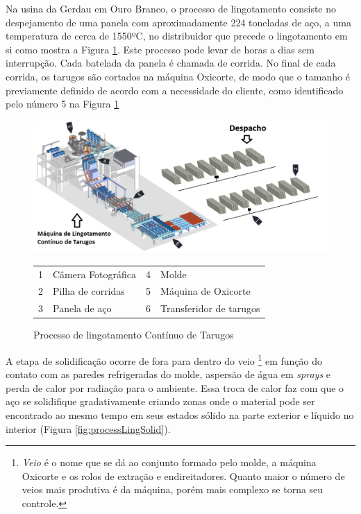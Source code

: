 Na usina da Gerdau em Ouro Branco, o processo de lingotamento consiste no despejamento de uma panela com aproximadamente 224 toneladas de aço, a uma temperatura de cerca de 1550ºC, no distribuidor que precede o lingotamento em si como mostra a Figura \ref{fig:processLing}.
%
Este processo pode levar de horas a dias sem interrupção.
%
Cada batelada da panela é chamada de corrida.
%
No final de cada corrida, os tarugos são cortados na máquina Oxicorte, de modo que o tamanho é previamente definido de acordo com a necessidade do cliente, como identificado pelo número 5 na Figura \ref{fig:processLing}

 \begin{figure}[H]
	\centering
	\includegraphics[width=1\linewidth]{figuras/Steel/process.png}
	\caption{Processo de lingotamento Contínuo de Tarugos}
	\begin{tabular}{r@{: }l r@{: }l}
        1 & Câmera Fotográfica & 4 & Molde \\
        2& Pilha de corridas & 5 & Máquina de Oxicorte \\
        3 & Panela de aço& 6 & Transferidor de tarugos \\
    \end{tabular}
	\label{fig:processLing}
\end{figure}

A etapa de solidificação ocorre de fora para dentro do veio
%
\footnote{\textit{Veio} é o nome que se dá ao conjunto formado pelo molde, a máquina Oxicorte e os rolos de extração e endireitadores. Quanto maior o número de veios mais produtiva é da máquina, porém mais complexo se torna seu controle.} 
%
em função do contato com as paredes refrigeradas do molde, aspersão de água em \textit{sprays} e perda de calor por radiação para o ambiente. Essa troca de calor faz com que o aço se solidifique gradativamente criando zonas onde o material pode ser encontrado ao mesmo tempo em seus estados sólido na parte exterior e líquido no interior (Figura \ref{fig:processLingSolid}).

